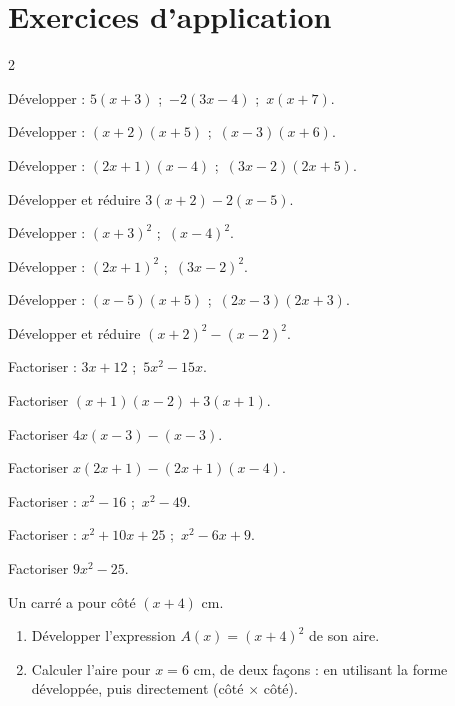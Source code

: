 \section{Exercices d'application}
\begin{multicols}{2}

\exo{} Développer : $5(x+3)$ ;\ $-2(3x-4)$ ;\ $x(x+7)$.

\exo{} Développer : $(x+2)(x+5)$ ;\ $(x-3)(x+6)$.

\exo{} Développer : $(2x+1)(x-4)$ ;\ $(3x-2)(2x+5)$.

\exo{} Développer et réduire $3(x+2)-2(x-5)$.

\exo{} Développer : $(x+3)^{2}$ ;\ $(x-4)^{2}$.

\exo{} Développer : $(2x+1)^{2}$ ;\ $(3x-2)^{2}$.

\exo{} Développer : $(x-5)(x+5)$ ;\ $(2x-3)(2x+3)$.

\exo{} Développer et réduire $(x+2)^{2}-(x-2)^{2}$.

\exo{} Factoriser : $3x+12$ ;\ $5x^{2}-15x$.

\exo{} Factoriser $(x+1)(x-2)+3(x+1)$.

\exo{} Factoriser $4x(x-3)-(x-3)$.

\exo{} Factoriser $x(2x+1)-(2x+1)(x-4)$.

\exo{} Factoriser : $x^{2}-16$ ;\ $x^{2}-49$.

\exo{} Factoriser : $x^{2}+10x+25$ ;\ $x^{2}-6x+9$.

\exo{} Factoriser $9x^{2}-25$.

\exo{} Un carré a pour côté $(x+4)$ cm.
\begin{enumerate}[label=\alph*)]
\item Développer l'expression $A(x)=(x+4)^{2}$ de son aire.
\item Calculer l'aire pour $x=6$ cm, de deux façons : en utilisant la forme développée, puis
directement (côté $\times$ côté).
\end{enumerate}

\end{multicols}

